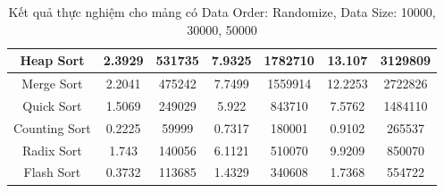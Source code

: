 \begin{table}[H]
{\begin{tabular}{|ccccccc|}
\multicolumn{1}{|c|}{Heap Sort} & \multicolumn{1}{c|}{2.3929} & \multicolumn{1}{c|}{531735} & \multicolumn{1}{c|}{7.9325} & \multicolumn{1}{c|}{1782710} & \multicolumn{1}{c|}{13.107} & \multicolumn{1}{c|}{3129809} \\ \hline
\multicolumn{1}{|c|}{Merge Sort} & \multicolumn{1}{c|}{2.2041} & \multicolumn{1}{c|}{475242} & \multicolumn{1}{c|}{7.7499} & \multicolumn{1}{c|}{1559914} & \multicolumn{1}{c|}{12.2253} & \multicolumn{1}{c|}{2722826} \\ \hline
\multicolumn{1}{|c|}{Quick Sort} & \multicolumn{1}{c|}{1.5069} & \multicolumn{1}{c|}{249029} & \multicolumn{1}{c|}{5.922} & \multicolumn{1}{c|}{843710} & \multicolumn{1}{c|}{7.5762} & \multicolumn{1}{c|}{1484110} \\ \hline
\multicolumn{1}{|c|}{Counting Sort} & \multicolumn{1}{c|}{0.2225} & \multicolumn{1}{c|}{59999} & \multicolumn{1}{c|}{0.7317} & \multicolumn{1}{c|}{180001} & \multicolumn{1}{c|}{0.9102} & \multicolumn{1}{c|}{265537} \\ \hline
\multicolumn{1}{|c|}{Radix Sort} & \multicolumn{1}{c|}{1.743} & \multicolumn{1}{c|}{140056} & \multicolumn{1}{c|}{6.1121} & \multicolumn{1}{c|}{510070} & \multicolumn{1}{c|}{9.9209} & \multicolumn{1}{c|}{850070} \\ \hline
\multicolumn{1}{|c|}{Flash Sort} & \multicolumn{1}{c|}{0.3732} & \multicolumn{1}{c|}{113685} & \multicolumn{1}{c|}{1.4329} & \multicolumn{1}{c|}{340608} & \multicolumn{1}{c|}{1.7368} & \multicolumn{1}{c|}{554722} \\ \hline
\end{tabular}%
}
\caption{Kết quả thực nghiệm cho mảng có Data Order: Randomize, Data Size: 10000, 30000, 50000}
\label{tab:randomize_10000_30000_50000}
\end{table}


